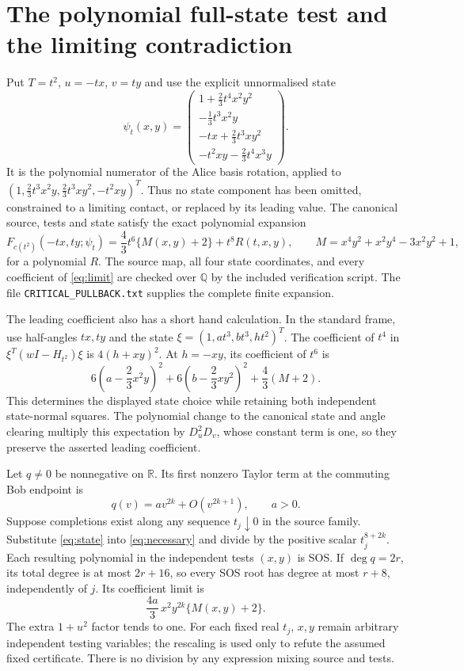 \documentclass[11pt]{article}
\newcommand{\R}{\mathbb R}
\begin{document}
\section{The polynomial full-state test and the limiting contradiction}
Put $T=t^2$, $u=-tx$, $v=ty$ and use the explicit unnormalised state
\begin{equation}\label{eq:state}
\psi_t(x,y)=\begin{pmatrix}
1+\frac23t^4x^2y^2\\
-\frac13t^3x^2y\\
-tx+\frac23t^3xy^2\\
-t^2xy-\frac23t^4x^3y
\end{pmatrix}.
\end{equation}
It is the polynomial numerator of the Alice basis rotation, applied to
$(1,\frac23t^3x^2y,\frac23t^3xy^2,-t^2xy)^T$. Thus no state component
has been omitted, constrained to a limiting contact, or replaced by its
leading value. The canonical source, tests and state satisfy the exact
polynomial expansion
\begin{equation}\label{eq:limit}
F_{c(t^2)}(-tx,ty;\psi_t)
=\frac43t^6\{M(x,y)+2\}+t^8 R(t,x,y),
\qquad
M=x^4y^2+x^2y^4-3x^2y^2+1,
\end{equation}
for a polynomial $R$. The source map, all four state coordinates, and every
coefficient of \eqref{eq:limit} are checked over $\mathbb Q$ by
the included verification script. The file \texttt{CRITICAL\_PULLBACK.txt}
supplies the complete finite expansion.

The leading coefficient also has a short hand calculation. In the standard
frame, use half-angles $tx,ty$ and the state
$\xi=(1,at^3,bt^3,ht^2)^T$. The coefficient of $t^4$ in
$\xi^T(wI-H_{t^2})\xi$ is $4(h+xy)^2$. At $h=-xy$, its coefficient of
$t^6$ is
\[
6\left(a-\frac23x^2y\right)^2+
6\left(b-\frac23xy^2\right)^2+\frac43(M+2).
\]
This determines the displayed state choice while retaining both independent
state-normal squares. The polynomial change to the canonical state and
angle clearing multiply this expectation by $D_u^2D_v$, whose constant
term is one, so they preserve the asserted leading coefficient.

Let $q\ne0$ be nonnegative on $\R$. Its first nonzero Taylor term at the
commuting Bob endpoint is
\[
q(v)=a v^{2k}+O(v^{2k+1}),\qquad a>0.
\]
Suppose completions exist along any sequence $t_j\downarrow0$ in the source
family. Substitute \eqref{eq:state} into \eqref{eq:necessary} and divide by
the positive scalar $t_j^{8+2k}$. Each resulting polynomial in the independent
tests $(x,y)$ is SOS. If $\deg q=2r$, its total degree is at most
$2r+16$, so every SOS root has degree at most $r+8$, independently of $j$.
Its coefficient limit is
\begin{equation}\label{eq:last}
\frac{4a}{3}\,x^2y^{2k}\{M(x,y)+2\}.
\end{equation}
The extra $1+u^2$ factor tends to one. For each fixed real $t_j$, $x,y$
remain arbitrary independent testing variables; the rescaling is used only
to refute the assumed fixed certificate. There is no division by any
expression mixing source and tests.
\end{document}

